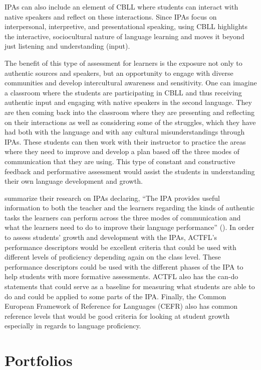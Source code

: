 \documentclass[output=paper]{langscibook}
\begin{document}
IPAs can also include an element of CBLL where students can interact with native speakers and reflect on these interactions. Since IPAs focus on interpersonal, interpretive, and presentational speaking, using CBLL highlights the interactive, sociocultural nature of language learning and moves it beyond just listening and understanding (input).

The benefit of this type of assessment for learners is the exposure not only to authentic sources and speakers, but an opportunity to engage with diverse communities and develop intercultural awareness and sensitivity. One can imagine a classroom where the students are participating in CBLL and thus receiving authentic input and engaging with native speakers in the second language. They are then coming back into the classroom where they are presenting and reflecting on their interactions as well as considering some of the struggles, which they have had both with the language and with any cultural misunderstandings through IPAs. These students can then work with their instructor to practice the areas where they need to improve and develop a plan based off the three modes of communication that they are using. This type of constant and constructive feedback and performative assessment would assist the students in understanding their own language development and growth.

\citet{Adair-HauckTroyan2013} summarize their research on IPAs declaring, “The IPA provides useful information to both the teacher and the learners regarding the kinds of authentic tasks the learners can perform across the three modes of communication and what the learners need to do to improve their language performance” (\citeyear[37]{Adair-HauckTroyan2013}). In order to assess students’ growth and development with the IPAs, ACTFL’s performance descriptors would be excellent criteria that could be used with different levels of proficiency depending again on the class level. These performance descriptors could be used with the different phases of the IPA to help students with more formative assessments. ACTFL also has the can-do statements that could serve as a baseline for measuring what students are able to do and could be applied to some parts of the IPA. Finally, the Common European Framework of Reference for Languages (CEFR) also has common reference levels that would be good criteria for looking at student growth especially in regards to language proficiency.

\section{Portfolios}
\end{document}
